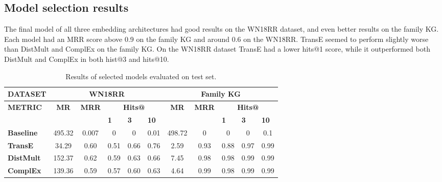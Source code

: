 \subsection{Model selection results}
The final model of all three embedding architectures had good results on the WN18RR dataset, and even better results on the family KG. Each model had an MRR score above 0.9 on the family KG and around 0.6 on the WN18RR. TransE seemed to perform slightly worse than DistMult and ComplEx on the family KG. On the WN18RR dataset TransE had a lower hits@1 score, while it outperformed both DistMult and ComplEx in both hist@3 and hits@10.
\begin{table}[h]
\centering
\begin{tabular}{|l||ccccc||ccccc|}
\hline
{\textbf{DATASET}}                 & \multicolumn{5}{c||}{\textbf{WN18RR}}                                                                                                                                               & \multicolumn{5}{c|}{\textbf{Family KG}}                                                                                                                            \\ \hline
\multirow{2}{*}{{\textbf{METRIC}}} & \multicolumn{1}{c|}{\multirow{2}{*}{\textbf{MR}}} & \multicolumn{1}{c|}{\multirow{2}{*}{\textbf{MRR}}} & \multicolumn{3}{c||}{\textbf{Hits@}}                                       & \multicolumn{1}{c|}{\multirow{2}{*}{\textbf{MR}}} & \multicolumn{1}{c|}{\multirow{2}{*}{\textbf{MRR}}} & \multicolumn{3}{c|}{\textbf{Hits@}}                                       \\ \cline{4-6} \cline{9-11} 
                                       & \multicolumn{1}{c|}{}                             & \multicolumn{1}{c|}{}                              & \multicolumn{1}{l|}{\textbf{1}} & \multicolumn{1}{l|}{\textbf{3}} & \multicolumn{1}{l||}{\textbf{10}} & \multicolumn{1}{c|}{}                             & \multicolumn{1}{c|}{}                              & \multicolumn{1}{l|}{\textbf{1}} & \multicolumn{1}{l|}{\textbf{3}} & \multicolumn{1}{l|}{\textbf{10}} \\ \hline
\textbf{Baseline}       & 495.32     & 0.007      & 0     & 0       & 0.01        & 498.72       & 0     & 0       & 0       & 0.1      \\ 
\textbf{TransE}  & 34.29  & 0.60       & 0.51                     & 0.66    & 0.76 & 2.59     & 0.93  &0.88  & 0.97   & 0.99   \\ 
\textbf{DistMult}      & 152.37  & 0.62    & 0.59   & 0.63      & 0.66   & 7.45    & 0.98     & 0.98    & 0.99   & 0.99    \\ 
\textbf{ComplEx}        & 139.36    & 0.59      & 0.57      & 0.60      & 0.63      & 4.64     & 0.99     & 0.98     & 0.99      & 0.99  \\ \hline
\end{tabular}
\caption{Results of selected models evaluated on test set.}
\end{table}


